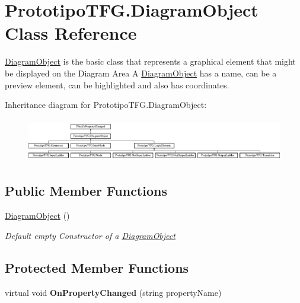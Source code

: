 \hypertarget{class_prototipo_t_f_g_1_1_diagram_object}{}\section{Prototipo\+T\+F\+G.\+Diagram\+Object Class Reference}
\label{class_prototipo_t_f_g_1_1_diagram_object}


\hyperlink{class_prototipo_t_f_g_1_1_diagram_object}{Diagram\+Object} is the basic class that represents a graphical element that might be displayed on the Diagram Area A \hyperlink{class_prototipo_t_f_g_1_1_diagram_object}{Diagram\+Object} has a name, can be a preview element, can be highlighted and also has coordinates.  


Inheritance diagram for Prototipo\+T\+F\+G.\+Diagram\+Object\+:\begin{figure}[H]
\begin{center}
\leavevmode
\includegraphics[height=1.924399cm]{class_prototipo_t_f_g_1_1_diagram_object}
\end{center}
\end{figure}
\subsection*{Public Member Functions}
\begin{DoxyCompactItemize}
\item 
\hyperlink{class_prototipo_t_f_g_1_1_diagram_object_a933641f592b262ec5b4a65932fdfb3ac}{Diagram\+Object} ()
\begin{DoxyCompactList}\small\item\em Default empty Constructor of a \hyperlink{class_prototipo_t_f_g_1_1_diagram_object}{Diagram\+Object} \end{DoxyCompactList}\end{DoxyCompactItemize}
\subsection*{Protected Member Functions}
\begin{DoxyCompactItemize}
\item 
\hypertarget{class_prototipo_t_f_g_1_1_diagram_object_ac96db1c8962b33616e588e05db6d5672}{}virtual void {\bfseries On\+Property\+Changed} (string property\+Name)\label{class_prototipo_t_f_g_1_1_diagram_object_ac96db1c8962b33616e588e05db6d5672}

\end{DoxyCompactItemize}
